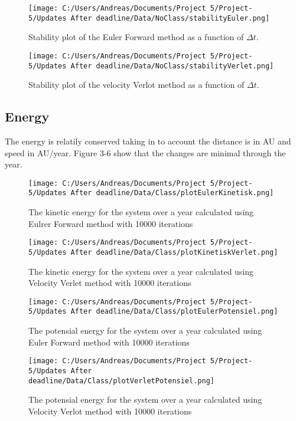 \documentclass[twoside,twocolumn]{article}
\begin{document}
\begin{figure}[H]  \texttt{[image: C:/Users/Andreas/Documents/Project 5/Project-5/Updates After deadline/Data/NoClass/stabilityEuler.png]}
  \caption{Stability plot of the Euler Forward method as a function of $\Delta t$.}
  \label{fig:boat1}
\end{figure}
\begin{figure}[H]  \texttt{[image: C:/Users/Andreas/Documents/Project 5/Project-5/Updates After deadline/Data/NoClass/stabilityVerlet.png]}
  \caption{Stability plot of the velocity Verlot method as a function of $\Delta t$.}
  \label{fig:boat2}
\end{figure}

\subsection{Energy}

The energy is relatily conserved taking in to account the distance is in AU and speed in AU/year. Figure 3-6 show that the changes are minimal through the year.
\begin{figure}[H]  \texttt{[image: C:/Users/Andreas/Documents/Project 5/Project-5/Updates After deadline/Data/Class/plotEulerKinetisk.png]}
  \caption{The kinetic energy for the system over a year calculated using Eulrer Forward method with 10000 iterations}
  \label{fig:boat2}
\end{figure}
\begin{figure}[H]  \texttt{[image: C:/Users/Andreas/Documents/Project 5/Project-5/Updates After deadline/Data/Class/plotKinetiskVerlet.png]}
  \caption{The kinetic energy for the system over a year calculated using Velocity Verlet method with 10000 iterations}
  \label{fig:boat2}
\end{figure}
\begin{figure}[H]  \texttt{[image: C:/Users/Andreas/Documents/Project 5/Project-5/Updates After deadline/Data/Class/plotEulerPotensiel.png]}
  \caption{The potensial energy for the system over a year calculated using Euler Forward method with 10000 iterations}
  \label{fig:boat2}
\end{figure}
\begin{figure}[H]  \texttt{[image: C:/Users/Andreas/Documents/Project 5/Project-5/Updates After deadline/Data/Class/plotVerletPotensiel.png]}
  \caption{The potensial energy for the system over a year calculated using Velocity Verlot method with 10000 iterations}
  \label{fig:boat2}
\end{figure}
\end{document}
